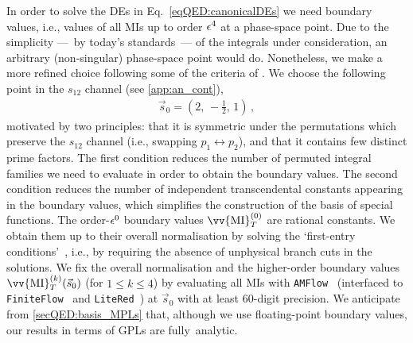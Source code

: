 \documentclass[main.tex]{subfiles}
\begin{document}
In order to solve the DEs in Eq.~\ref{eqQED:canonicalDEs} we need boundary values, i.e., values of all MIs up to order $\epsilon^4$ at a phase-space point. 
Due to the simplicity ---~by today's standards~--- of the integrals under consideration, an arbitrary (non-singular) phase-space point would do. 
Nonetheless, we make a more refined choice following some of the criteria of .
We choose the following point in the $s_{12}$ channel (see \cref{app:an_cont}),
\begin{align} \label{eqQED:s0}
\vec{s}_0 = \left( 2, \, -\frac{1}{2}, \, 1 \right) \,,
\end{align}
motivated by two principles: that it is symmetric under the permutations which preserve the $s_{12}$ channel (i.e., swapping $p_1 \leftrightarrow p_2$), and that it contains few distinct prime factors.
The first condition reduces the number of permuted integral families we need to evaluate in order to obtain the boundary values.
The second condition reduces the number of independent transcendental constants appearing in the boundary values, which simplifies the construction of the basis of special functions. 
The order-$\epsilon^0$ boundary values $\vv{\text{MI}}_T^{(0)}$ are rational constants. We obtain them up to their overall normalisation by solving the `first-entry conditions'~\cite{Gaiotto:2011dt}, i.e., by requiring the absence of unphysical branch cuts in the solutions. We fix the overall normalisation and the higher-order boundary values $\vv{\text{MI}}_T^{(k)}(\vec{s}_0)$ (for $1\le k\le 4$) by evaluating all MIs with \texttt{AMFlow}~\cite{Liu:2022chg} (interfaced to 
\texttt{FiniteFlow}~\cite{Peraro:2019svx} and \texttt{LiteRed}~\cite{Lee:2012cn}) at $\vec{s}_0$ with at least $60$-digit precision.
We anticipate from \cref{secQED:basis_MPLs} that, although we use floating-point boundary values, our results in terms of GPLs are fully~analytic. 
\end{document}
